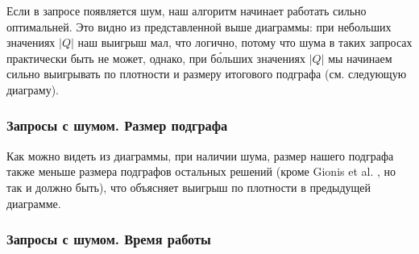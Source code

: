 Если в запросе появляется шум, наш алгоритм начинает работать сильно оптимальней. Это видно из представленной выше диаграммы: при небольших значениях $|Q|$ наш выигрыш мал, что логично, потому что шума в таких запросах практически быть не может, однако, при б\'{о}льших значениях $|Q|$ мы начинаем сильно выигрывать по плотности и размеру итогового подграфа (см. следующую диаграму). 

\subsubsection{Запросы с шумом. Размер подграфа}

  \begin{center}
  \end{center}

Как можно видеть из диаграммы, при наличии шума, размер нашего подграфа также меньше размера подграфов остальных решений (кроме Gionis et al. \cite{Gionis15}, но так и должно быть), что объясняет выигрыш по плотности в предыдущей диаграмме.

\subsubsection{Запросы с шумом. Время работы}

